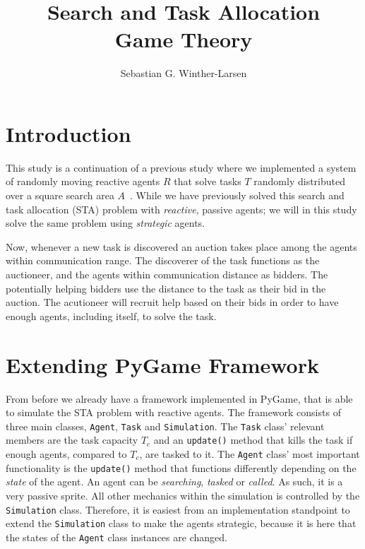 \documentclass[11pt]{article}
\title{Search and Task Allocation \\
    \small{Game Theory}}
\author{Sebastian G. Winther-Larsen}
\begin{document}
    \maketitle

    \section{Introduction}
        This study is a continuation of a previous study where we 
        implemented a system of randomly moving reactive agents
        $R$ that solve tasks $T$ randomly distributed over 
        a square search area $A$~\cite{greg2020mas}. While we have 
        previously solved this search and task allocation (STA) problem
        with \emph{reactive}, passive agents; we will in this study solve the 
        same problem using \emph{strategic} agents.

        Now, whenever a new task is discovered an auction takes place among the 
        agents within communication range. The discoverer of the task functions 
        as the auctioneer, and the agents within communication distance as
        bidders. The potentially helping bidders use the distance to the 
        task as their bid in the auction. The acutioneer will recruit help 
        based on their bids in order to have enough agents, including itself,
        to solve the task.

    \section{Extending PyGame Framework}

        From before we already have a framework implemented in PyGame\cite{pygame},
        that is able to simulate the STA problem with reactive agents. The 
        framework consists of three main classes, \lstinline|Agent|, \lstinline|Task|
        and \lstinline|Simulation|. The \lstinline|Task| class' relevant members
        are the task capacity $T_c$ and an \lstinline|update()| method that kills the 
        task if enough agents, compared to $T_c$, are tasked to it. The \lstinline|Agent|
        class' most important functionality is the \lstinline|update()| method that 
        functions differently depending on the \emph{state} of the agent. An agent can be 
        \emph{searching}, \emph{tasked} or \emph{called}. As such, it is a very passive 
        sprite. All other mechanics within the simulation is controlled by the 
        \lstinline|Simulation| class. Therefore, it is easiest from an implementation 
        standpoint to extend the \lstinline|Simulation| class to make the 
        agents strategic, because it is here that the states of the \lstinline|Agent| 
        class instances are changed.
\end{document}
